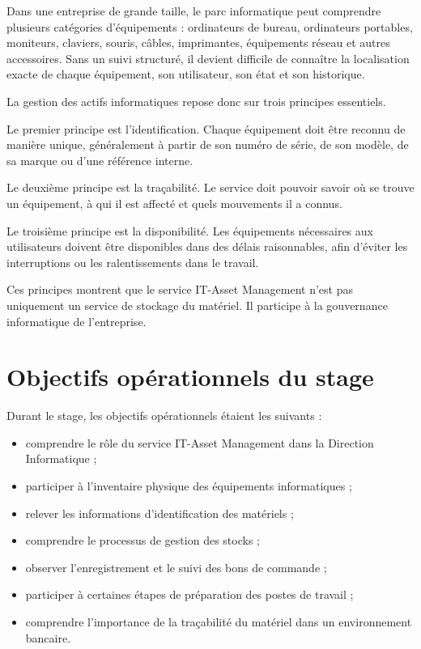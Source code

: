 \documentclass[12pt,a4paper]{report}
\begin{document}
Dans une entreprise de grande taille, le parc informatique peut comprendre plusieurs catégories d'équipements : ordinateurs de bureau, ordinateurs portables, moniteurs, claviers, souris, câbles, imprimantes, équipements réseau et autres accessoires. Sans un suivi structuré, il devient difficile de connaître la localisation exacte de chaque équipement, son utilisateur, son état et son historique.

La gestion des actifs informatiques repose donc sur trois principes essentiels.

Le premier principe est l'identification. Chaque équipement doit être reconnu de manière unique, généralement à partir de son numéro de série, de son modèle, de sa marque ou d'une référence interne.

Le deuxième principe est la traçabilité. Le service doit pouvoir savoir où se trouve un équipement, à qui il est affecté et quels mouvements il a connus.

Le troisième principe est la disponibilité. Les équipements nécessaires aux utilisateurs doivent être disponibles dans des délais raisonnables, afin d'éviter les interruptions ou les ralentissements dans le travail.

Ces principes montrent que le service IT-Asset Management n'est pas uniquement un service de stockage du matériel. Il participe à la gouvernance informatique de l'entreprise.

\section{Objectifs opérationnels du stage}

Durant le stage, les objectifs opérationnels étaient les suivants :

\begin{itemize}[label=--]
    \item comprendre le rôle du service IT-Asset Management dans la Direction Informatique ;
    \item participer à l'inventaire physique des équipements informatiques ;
    \item relever les informations d'identification des matériels ;
    \item comprendre le processus de gestion des stocks ;
    \item observer l'enregistrement et le suivi des bons de commande ;
    \item participer à certaines étapes de préparation des postes de travail ;
    \item comprendre l'importance de la traçabilité du matériel dans un environnement bancaire.
\end{itemize}
\end{document}
